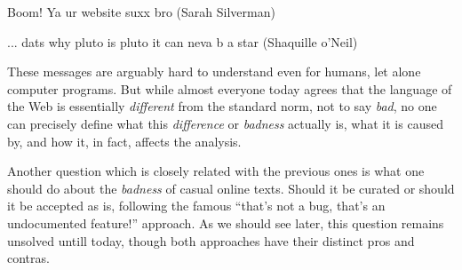 \begin{example}
Boom! Ya ur website suxx bro {\upshape (Sarah Silverman)}

... dats why pluto is pluto it can neva b a star {\upshape (Shaquille o'Neil)}
\end{example}
These messages are arguably hard to understand even for humans, let alone
computer programs.  But while almost everyone today agrees that the language
of the Web is essentially \emph{different} from the standard norm, not to say
\emph{bad}, no one can precisely define what this \emph{difference} or
\emph{badness} actually is, what it is caused by, and how it, in fact, affects
the analysis.


Another question which is closely related with the previous ones is what one
should do about the \emph{badness} of casual online texts.  Should it be
curated or should it be accepted as is, following the famous ``that's not a
bug, that's an undocumented feature!'' approach.  As we should see later, this
question remains unsolved untill today, though both approaches have their
distinct pros and contras.
